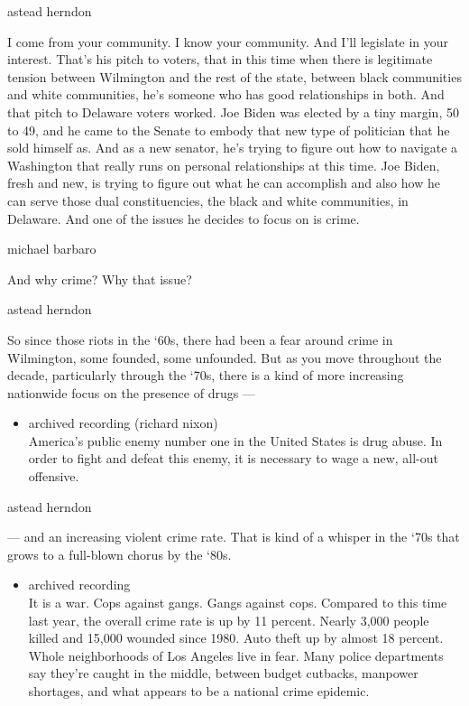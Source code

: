 astead herndon

I come from your community. I know your community. And I'll legislate in
your interest. That's his pitch to voters, that in this time when there
is legitimate tension between Wilmington and the rest of the state,
between black communities and white communities, he's someone who has
good relationships in both. And that pitch to Delaware voters worked.
Joe Biden was elected by a tiny margin, 50 to 49, and he came to the
Senate to embody that new type of politician that he sold himself as.
And as a new senator, he's trying to figure out how to navigate a
Washington that really runs on personal relationships at this time. Joe
Biden, fresh and new, is trying to figure out what he can accomplish and
also how he can serve those dual constituencies, the black and white
communities, in Delaware. And one of the issues he decides to focus on
is crime.

michael barbaro

And why crime? Why that issue?

astead herndon

So since those riots in the `60s, there had been a fear around crime in
Wilmington, some founded, some unfounded. But as you move throughout the
decade, particularly through the `70s, there is a kind of more
increasing nationwide focus on the presence of drugs ---

\begin{itemize}
\tightlist
\item
  archived recording (richard nixon)\\
  America's public enemy number one in the United States is drug abuse.
  In order to fight and defeat this enemy, it is necessary to wage a
  new, all-out offensive.
\end{itemize}

astead herndon

--- and an increasing violent crime rate. That is kind of a whisper in
the `70s that grows to a full-blown chorus by the `80s.

\begin{itemize}
\tightlist
\item
  archived recording\\
  It is a war. Cops against gangs. Gangs against cops. Compared to this
  time last year, the overall crime rate is up by 11 percent. Nearly
  3,000 people killed and 15,000 wounded since 1980. Auto theft up by
  almost 18 percent. Whole neighborhoods of Los Angeles live in fear.
  Many police departments say they're caught in the middle, between
  budget cutbacks, manpower shortages, and what appears to be a national
  crime epidemic.
\end{itemize}

